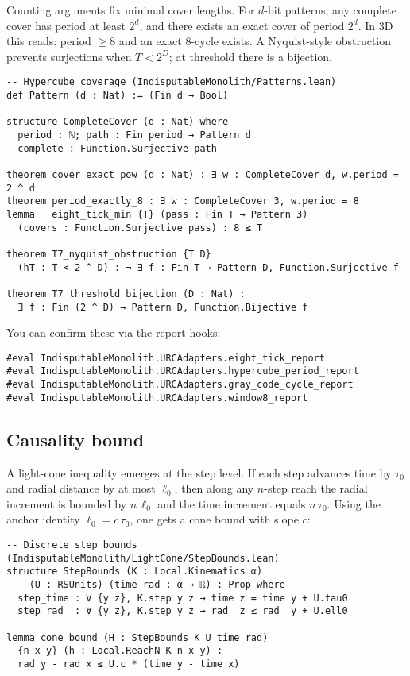\documentclass[11pt,a4paper,twoside]{article}
\numberwithin{equation}{section}
\theoremstyle{customthm}
\theoremstyle{customdef}
\theoremstyle{customrem}
\begin{document}
Counting arguments fix minimal cover lengths. For $d$-bit patterns, any complete cover has period at least $2^d$, and there exists an exact cover of period $2^d$. In 3D this reads: period $\ge 8$ and an exact 8-cycle exists. A Nyquist-style obstruction prevents surjections when $T<2^D$; at threshold there is a bijection.

\begin{lstlisting}
-- Hypercube coverage (IndisputableMonolith/Patterns.lean)
def Pattern (d : Nat) := (Fin d → Bool)

structure CompleteCover (d : Nat) where
  period : ℕ; path : Fin period → Pattern d
  complete : Function.Surjective path

theorem cover_exact_pow (d : Nat) : ∃ w : CompleteCover d, w.period = 2 ^ d
theorem period_exactly_8 : ∃ w : CompleteCover 3, w.period = 8
lemma   eight_tick_min {T} (pass : Fin T → Pattern 3)
  (covers : Function.Surjective pass) : 8 ≤ T

theorem T7_nyquist_obstruction {T D}
  (hT : T < 2 ^ D) : ¬ ∃ f : Fin T → Pattern D, Function.Surjective f

theorem T7_threshold_bijection (D : Nat) :
  ∃ f : Fin (2 ^ D) → Pattern D, Function.Bijective f
\end{lstlisting}

You can confirm these via the report hooks:

\begin{lstlisting}
#eval IndisputableMonolith.URCAdapters.eight_tick_report
#eval IndisputableMonolith.URCAdapters.hypercube_period_report
#eval IndisputableMonolith.URCAdapters.gray_code_cycle_report
#eval IndisputableMonolith.URCAdapters.window8_report
\end{lstlisting}

\subsection{Causality bound}

A light-cone inequality emerges at the step level. If each step advances time by $\tau_0$ and radial distance by at most $\ell_0$, then along any $n$-step reach the radial increment is bounded by $n\,\ell_0$ and the time increment equals $n\,\tau_0$. Using the anchor identity $\ell_0 = c\,\tau_0$, one gets a cone bound with slope $c$:

\begin{lstlisting}
-- Discrete step bounds (IndisputableMonolith/LightCone/StepBounds.lean)
structure StepBounds (K : Local.Kinematics α)
    (U : RSUnits) (time rad : α → ℝ) : Prop where
  step_time : ∀ {y z}, K.step y z → time z = time y + U.tau0
  step_rad  : ∀ {y z}, K.step y z → rad  z ≤ rad  y + U.ell0

lemma cone_bound (H : StepBounds K U time rad)
  {n x y} (h : Local.ReachN K n x y) :
  rad y - rad x ≤ U.c * (time y - time x)
\end{lstlisting}
\end{document}
